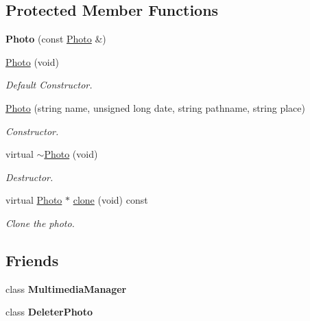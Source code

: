 \subsection*{Protected Member Functions}
\begin{DoxyCompactItemize}
\item 
\hypertarget{class_photo_abb4bbd2c8364074c7605469378fcb059}{{\bfseries Photo} (const \hyperlink{class_photo}{Photo} \&)}\label{class_photo_abb4bbd2c8364074c7605469378fcb059}

\item 
\hyperlink{class_photo_a8824dbd5d05f0e39a258a4d73a61b17d}{Photo} (void)
\begin{DoxyCompactList}\small\item\em Default Constructor. \end{DoxyCompactList}\item 
\hyperlink{class_photo_a01773598a3f49a95c5b166534b35d7c5}{Photo} (string name, unsigned long date, string pathname, string place)
\begin{DoxyCompactList}\small\item\em Constructor. \end{DoxyCompactList}\item 
virtual \hyperlink{class_photo_a5ecb1bc1fde85af2f0405fa2d32a5a97}{$\sim$\-Photo} (void)
\begin{DoxyCompactList}\small\item\em Destructor. \end{DoxyCompactList}\item 
virtual \hyperlink{class_photo}{Photo} $\ast$ \hyperlink{class_photo_af8733ff93a45f0135076fcb731af56d7}{clone} (void) const 
\begin{DoxyCompactList}\small\item\em Clone the photo. \end{DoxyCompactList}\end{DoxyCompactItemize}
\subsection*{Friends}
\begin{DoxyCompactItemize}
\item 
\hypertarget{class_photo_a29a97f20d6ded769adf9ecc47158e24f}{class {\bfseries Multimedia\-Manager}}\label{class_photo_a29a97f20d6ded769adf9ecc47158e24f}

\item 
\hypertarget{class_photo_a06ed064be90eaa3ca877fb41f11dbe34}{class {\bfseries Deleter\-Photo}}\label{class_photo_a06ed064be90eaa3ca877fb41f11dbe34}

\end{DoxyCompactItemize}


